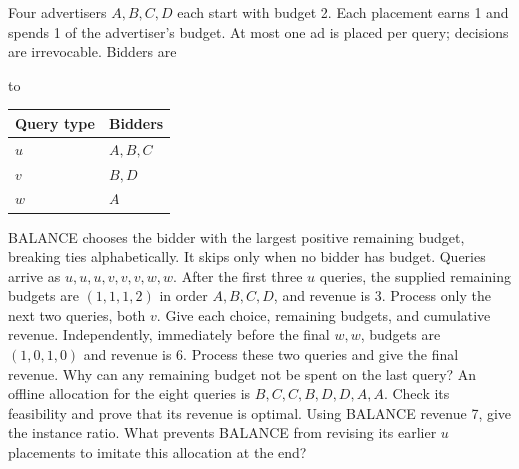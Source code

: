 \documentclass[10pt,a4paper,twocolumn]{article}
\newenvironment{examtable}[1]{%
  \par\addvspace{2pt}\noindent\hbox to \linewidth\bgroup\hfil
  \setlength{\tabcolsep}{4pt}%
  \renewcommand{\arraystretch}{1.12}\begin{tabular}{#1}%
}{\end{tabular}\hfil\egroup\par\addvspace{2pt}}
\begin{document}
Four advertisers $A,B,C,D$ each start with budget 2. Each placement earns 1 and spends 1 of the advertiser's budget. At most one ad is placed per query; decisions are irrevocable. Bidders are
\begin{examtable}{@{}ll@{}}
\toprule
Query type & Bidders\\
\midrule
$u$ & $A,B,C$\\
$v$ & $B,D$\\
$w$ & $A$\\
\bottomrule
\end{examtable}
BALANCE chooses the bidder with the largest positive remaining budget, breaking ties alphabetically. It skips only when no bidder has budget. Queries arrive as $u,u,u,v,v,v,w,w$.
 After the first three $u$ queries, the supplied remaining budgets are $(1,1,1,2)$ in order $A,B,C,D$, and revenue is 3. Process only the next two queries, both $v$. Give each choice, remaining budgets, and cumulative revenue.
 Independently, immediately before the final $w,w$, budgets are $(1,0,1,0)$ and revenue is 6. Process these two queries and give the final revenue. Why can any remaining budget not be spent on the last query?
 An offline allocation for the eight queries is $B,C,C,B,D,D,A,A$. Check its feasibility and prove that its revenue is optimal. Using BALANCE revenue 7, give the instance ratio. What prevents BALANCE from revising its earlier $u$ placements to imitate this allocation at the end?
\end{document}
